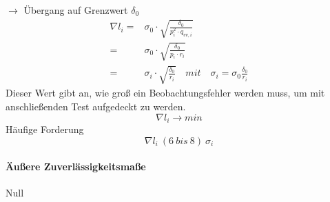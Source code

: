 \documentclass[12pt]{article}
\begin{document}
$\longrightarrow$ Übergang auf Grenzwert $\delta_0$
\begin{align*}
\nabla l_i = & \sigma_0 \cdot \sqrt{\frac{\delta_0}{p_i^2 \cdot q_{vv,i}}} \\
=& \sigma_0 \cdot \sqrt{\frac{\delta_0}{p_i \cdot r_i}} \\
=& \sigma_i \cdot \sqrt{\frac{\delta_0}{r_i}} \quad mit \quad  \sigma_i = \sigma_0 \frac{\delta_0}{r_i}
\end{align*}
Dieser Wert gibt an, wie groß ein Beobachtungsfehler werden muss, um mit anschließenden Test aufgedeckt zu werden.
\begin{equation*}
\nabla l_i \longrightarrow min
\end{equation*}
Häufige Forderung
\begin{equation*}
\nabla l_i ~ (6\ bis \ 8)\ \sigma_i
\end{equation*}
\paragraph{Äußere Zuverlässigkeitsmaße}
\noindent Null
\end{document}
